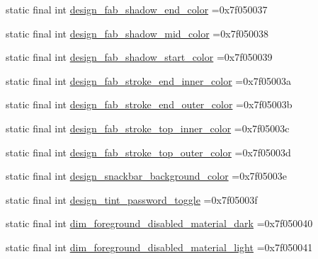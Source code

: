 \begin{DoxyCompactItemize}
\item 
static final int \mbox{\hyperlink{classcom_1_1example_1_1trainawearapplication_1_1_r_1_1color_ad2d8d2523b8fdecd1b58060ea110cb2b}{design\+\_\+fab\+\_\+shadow\+\_\+end\+\_\+color}} =0x7f050037
\item 
static final int \mbox{\hyperlink{classcom_1_1example_1_1trainawearapplication_1_1_r_1_1color_aa25561499a6785e968ec14ad8938714b}{design\+\_\+fab\+\_\+shadow\+\_\+mid\+\_\+color}} =0x7f050038
\item 
static final int \mbox{\hyperlink{classcom_1_1example_1_1trainawearapplication_1_1_r_1_1color_a95a3b7acf2a9861d342fddbafc11502c}{design\+\_\+fab\+\_\+shadow\+\_\+start\+\_\+color}} =0x7f050039
\item 
static final int \mbox{\hyperlink{classcom_1_1example_1_1trainawearapplication_1_1_r_1_1color_a8f9347f6a206ac3de388119bf843c491}{design\+\_\+fab\+\_\+stroke\+\_\+end\+\_\+inner\+\_\+color}} =0x7f05003a
\item 
static final int \mbox{\hyperlink{classcom_1_1example_1_1trainawearapplication_1_1_r_1_1color_a90a8b7a406e309f08f17d3d1e1e96112}{design\+\_\+fab\+\_\+stroke\+\_\+end\+\_\+outer\+\_\+color}} =0x7f05003b
\item 
static final int \mbox{\hyperlink{classcom_1_1example_1_1trainawearapplication_1_1_r_1_1color_a33c882a2d545d7e22fcf1866a398d863}{design\+\_\+fab\+\_\+stroke\+\_\+top\+\_\+inner\+\_\+color}} =0x7f05003c
\item 
static final int \mbox{\hyperlink{classcom_1_1example_1_1trainawearapplication_1_1_r_1_1color_a4965233673acaf0b5d52cf904786051d}{design\+\_\+fab\+\_\+stroke\+\_\+top\+\_\+outer\+\_\+color}} =0x7f05003d
\item 
static final int \mbox{\hyperlink{classcom_1_1example_1_1trainawearapplication_1_1_r_1_1color_a45688853c6af1ef2039368bc64feb161}{design\+\_\+snackbar\+\_\+background\+\_\+color}} =0x7f05003e
\item 
static final int \mbox{\hyperlink{classcom_1_1example_1_1trainawearapplication_1_1_r_1_1color_a68451f63fd61ba890219c81f4b7256bf}{design\+\_\+tint\+\_\+password\+\_\+toggle}} =0x7f05003f
\item 
static final int \mbox{\hyperlink{classcom_1_1example_1_1trainawearapplication_1_1_r_1_1color_a1eb6594b96994d694d08f8aa429a00c5}{dim\+\_\+foreground\+\_\+disabled\+\_\+material\+\_\+dark}} =0x7f050040
\item 
static final int \mbox{\hyperlink{classcom_1_1example_1_1trainawearapplication_1_1_r_1_1color_a314e9b76c605079711ff9074b625d04d}{dim\+\_\+foreground\+\_\+disabled\+\_\+material\+\_\+light}} =0x7f050041

\end{DoxyCompactItemize}
